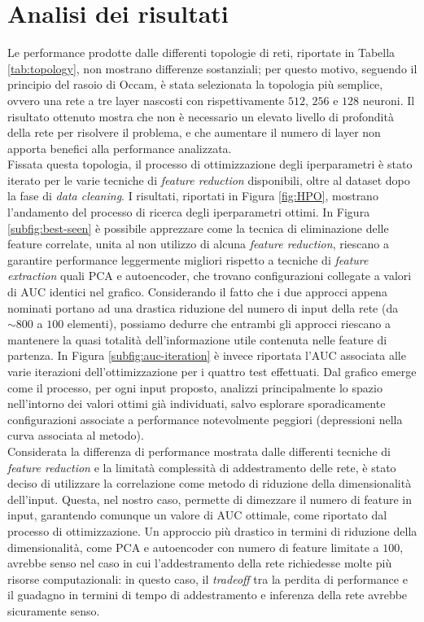 \section{Analisi dei risultati}
Le performance prodotte dalle differenti topologie di reti, riportate in Tabella \ref{tab:topology}, non mostrano differenze sostanziali; per questo motivo, seguendo il principio del rasoio di Occam, è stata selezionata la topologia più semplice, ovvero una rete a tre layer nascosti con rispettivamente $512$, $256$ e $128$ neuroni. Il risultato ottenuto mostra che non è necessario un elevato livello di profondità della rete per risolvere il problema, e che aumentare il numero di layer non apporta benefici alla performance analizzata.\\

Fissata questa topologia, il processo di ottimizzazione degli iperparametri è stato iterato per le varie tecniche di \textit{feature reduction} disponibili, oltre al dataset dopo la fase di \textit{data cleaning}. I risultati, riportati in Figura \ref{fig:HPO}, mostrano l'andamento del processo di ricerca degli iperparametri ottimi. In Figura \ref{subfig:best-seen} è possibile apprezzare come la tecnica di eliminazione delle feature correlate, unita al non utilizzo di alcuna \textit{feature reduction}, riescano a garantire performance leggermente migliori rispetto a tecniche di \textit{feature extraction} quali PCA e autoencoder, che trovano configurazioni collegate a valori di AUC identici nel grafico. Considerando il fatto che i due approcci appena nominati portano ad una drastica riduzione del numero di input della rete (da $\sim800$ a $100$ elementi), possiamo dedurre che entrambi gli approcci riescano a mantenere la quasi totalità dell'informazione utile contenuta nelle feature di partenza. In Figura \ref{subfig:auc-iteration} è invece riportata l'AUC associata alle varie iterazioni dell'ottimizzazione per i quattro test effettuati. Dal grafico emerge come il processo, per ogni input proposto, analizzi principalmente lo spazio nell'intorno dei valori ottimi già individuati, salvo esplorare sporadicamente configurazioni associate a performance notevolmente peggiori (depressioni nella curva associata al metodo).\\
Considerata la differenza di performance mostrata dalle differenti tecniche di \textit{feature reduction} e la limitatà complessità di addestramento delle rete, è stato deciso di utilizzare la correlazione come metodo di riduzione della dimensionalità dell'input. Questa, nel nostro caso, permette di dimezzare il numero di feature in input, garantendo comunque un valore di AUC ottimale, come riportato dal processo di ottimizzazione. Un approccio più drastico in termini di riduzione della dimensionalità, come PCA e autoencoder con numero di feature limitate a $100$, avrebbe senso nel caso in cui l'addestramento della rete richiedesse molte più risorse computazionali: in questo caso, il \textit{tradeoff} tra la perdita di performance e il guadagno in termini di tempo di addestramento e inferenza della rete avrebbe sicuramente senso.\\

